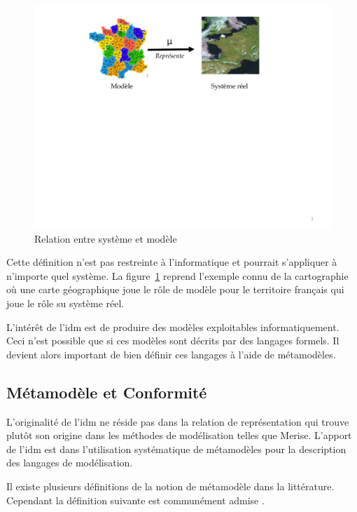 \begin{figure}[!htbp]
 \begin{center}
  \includegraphics[trim= 0cm 12cm 0cm 0cm, width=1\textwidth]{figures/images/Chapitre1/favresystememodele.pdf}
 \end{center}
 \caption{Relation entre système et modèle \protect\cite{favre2006ingenierie}}
 \label{fig:systemModele}
\end{figure}

Cette définition n'est pas restreinte à l'informatique et pourrait s'appliquer à 
n'importe quel système. 
La figure~\ref{fig:systemModele} reprend l'exemple connu de la cartographie où 
une carte géographique joue le rôle de modèle pour le territoire français qui joue le rôle su système réel.

L'intérêt de l'\gls{idm} est de produire des modèles exploitables informatiquement. 
Ceci n'est possible que si ces modèles sont décrits par des langages formels. Il 
devient alors important de bien définir ces langages à l'aide de métamodèles.

\subsection{Métamodèle et Conformité}
L'originalité de l'\gls{idm} ne réside pas dans la relation de représentation qui 
trouve plutôt son origine dans les méthodes de modélisation telles que Merise. L'apport de l'\gls{idm} est dans l'utilisation systématique de métamodèles pour la description des langages de modélisation. 

Il existe plusieurs définitions de la notion de métamodèle dans la littérature. 
Cependant la définition suivante est communément admise \cite{bezivin2004rapport}.
\\\

